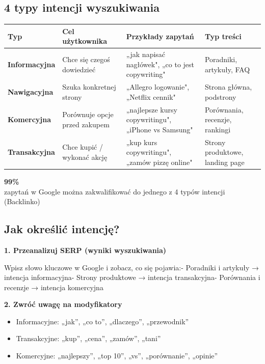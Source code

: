 \documentclass[
  12pt,
  a4paper,
  twoside,
  openright,
  12pt,
  DIV=12,
  BCOR=12mm]{scrbook}
\providecommand{\tightlist}{%
  \setlength{\itemsep}{0pt}\setlength{\parskip}{0pt}}\usepackage{longtable,booktabs,array}
\newcommand{\stathighlight}[2]{%
  \begin{center}
    \begin{tcolorbox}[
      enhanced,
      colback=primarylight,
      colframe=primaryblue,
      boxrule=1pt,
      arc=5pt,
      width=0.6\textwidth,
      halign=center
    ]
      {\fontsize{36}{40}\selectfont\bfseries\color{primarydark}#1}\\[5pt]
      {\color{textmuted}#2}
    \end{tcolorbox}
  \end{center}
}
\begin{document}
\subsection{4 typy intencji
wyszukiwania}\label{typy-intencji-wyszukiwania}

{\fontsize{9}{11}\selectfont
\begin{tabularx}{\textwidth}{>{\bfseries}p{2cm} X X X}
\toprule
Typ & Cel użytkownika & Przykłady zapytań & Typ treści \\
\midrule
Informacyjna & Chce się czegoś dowiedzieć & „jak napisać nagłówek", „co to jest copywriting" & Poradniki, artykuły, FAQ \\
Nawigacyjna & Szuka konkretnej strony & „Allegro logowanie", „Netflix cennik" & Strona główna, podstrony \\
Komercyjna & Porównuje opcje przed zakupem & „najlepsze kursy copywritingu", „iPhone vs Samsung" & Porównania, recenzje, rankingi \\
Transakcyjna & Chce kupić / wykonać akcję & „kup kurs copywritingu", „zamów pizzę online" & Strony produktowe, landing page \\
\bottomrule
\end{tabularx}
}

\stathighlight{99\%}{zapytań w Google można zakwalifikować do jednego z 4 typów intencji (Backlinko)}

\subsection{Jak określić
intencję?}\label{jak-okreux15bliux107-intencjux119}

\textbf{1. Przeanalizuj SERP (wyniki wyszukiwania)}

Wpisz słowo kluczowe w Google i zobacz, co się pojawia:\newline -
Poradniki i artykuły → intencja informacyjna\newline - Strony produktowe
→ intencja transakcyjna\newline - Porównania i recenzje → intencja
komercyjna\newline

\textbf{2. Zwróć uwagę na modyfikatory}

\begin{itemize}
\tightlist
\item
  Informacyjne: „jak'', „co to'', „dlaczego'', „przewodnik''
\item
  Transakcyjne: „kup'', „cena'', „zamów'', „tani''
\item
  Komercyjne: „najlepszy'', „top 10'', „vs'', „porównanie'', „opinie''
\end{itemize}
\end{document}
